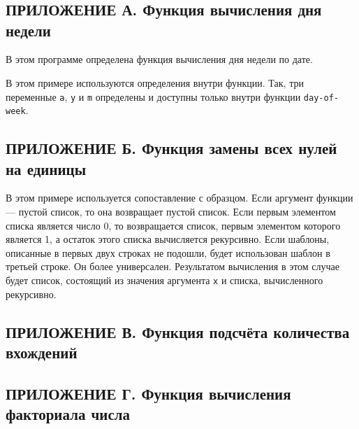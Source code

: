 \section*{\hfill}
    \subsection*{ПРИЛОЖЕНИЕ А. Функция вычисления дня недели}
    
    В этом программе определена функция вычисления дня недели по дате.

    В этом примере используются определения внутри функции.
    Так, три переменные \verb,a,, \verb,y, и \verb,m, определены и доступны только внутри функции \verb,day-of-week,.

    \subsection*{ПРИЛОЖЕНИЕ Б. Функция замены всех нулей на единицы}
    

    В этом примере используется сопоставление с образцом.
    Если аргумент функции --- пустой список, то она возвращает пустой список.
    Если первым элементом списка является число 0, то возвращается список, первым элементом которого является 1, а остаток этого списка вычисляется рекурсивно.
    Если шаблоны, описанные в первых двух строках не подошли, будет использован шаблон в третьей строке.
    Он более универсален.
    Результатом вычисления в этом случае будет список, состоящий из значения аргумента \verb,x, и списка, вычисленного рекурсивно.

    \subsection*{ПРИЛОЖЕНИЕ В. Функция подсчёта количества вхождений}
    

    \subsection*{ПРИЛОЖЕНИЕ Г. Функция вычисления факториала числа}
    

